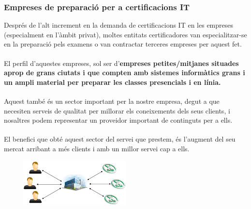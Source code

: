 \documentclass[12pt]{article}
\begin{document}
\subsubsection{Empreses de preparació per a certificacions IT}
Després de l'alt increment en la demanda de certificacions IT en les empreses (especialment en l'àmbit privat), moltes entitats certificadores van especialitzar-se en la preparació pels examens o van contractar terceres empreses per aquest fet.
\\\\El perfil d'aquestes empreses, sol ser d'\textbf{empreses petites/mitjanes situades aprop de grans ciutats i que compten amb sistemes informàtics grans i un ampli material per preparar les classes presencials i en línia.}
\\\\Aquest també és un sector important per la nostre empresa, degut a que necesiten serveis de qualitat per millorar els coneixements dels seus clients, i nosaltres podem representar un proveidor important de continguts per a ells.
\\\\El benefici que obté aquest sector del servei que prestem, és l'augment del seu mercat arribant a més clients i amb un millor servei cap a ells.
\begin{figure}[h!]
	\centering
	\includegraphics[width=0.5\textwidth]{imatges/PreparadoraFigura.png}
\end{figure}
\end{document}
